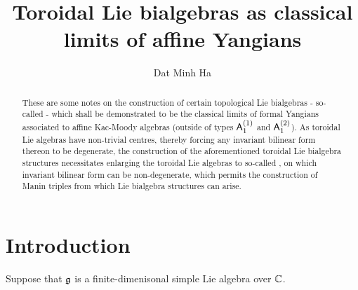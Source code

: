 

\setcounter{section}{-1}





    \title{Toroidal Lie bialgebras as classical limits of affine Yangians}
    
    \author{Dat Minh Ha}
    \maketitle
    
    \begin{abstract}
        These are some notes on the construction of certain topological Lie bialgebras - so-called  - which shall be demonstrated to be the classical limits of formal Yangians associated to affine Kac-Moody algebras (outside of types $\mathsf{A}_1^{(1)}$ and $\mathsf{A}_1^{(2)}$). As toroidal Lie algebras have non-trivial centres, thereby forcing any invariant bilinear form thereon to be degenerate, the construction of the aforementioned toroidal Lie bialgebra structures necessitates enlarging the toroidal Lie algebras to so-called , on which invariant bilinear form can be non-degenerate, which permits the construction of Manin triples from which Lie bialgebra structures can arise.
    \end{abstract}
    
    {
    \hypersetup{} 
    \tableofcontents %
    \listoftodos
    }

    \section{Introduction}
        Suppose that $\mathfrak{g}$ is a finite-dimenisonal simple Lie algebra over $\mathbb{C}$.
        

